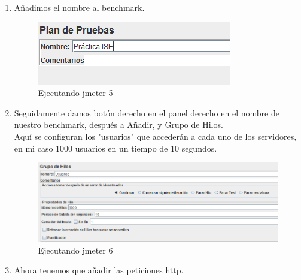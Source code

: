 \begin{enumerate}
	\item Añadimos el nombre al benchmark.
	\begin{figure}[H] %
		\centering
		\includegraphics[scale=0.5]{pics/5}  %
		\caption{Ejecutando jmeter 5} \label{fig:jmt5}
	\end{figure}

	\item Seguidamente damos botón derecho en el panel derecho en el nombre de nuestro benchmark, después a Añadir, y Grupo de Hilos.\\
	Aquí se configuran los "usuarios" que accederán a cada uno de los servidores, en mi caso 1000 usuarios en un tiempo de 10 segundos.
	
	\begin{figure}[H] %
		\centering
		\includegraphics[scale=0.5]{pics/6}  %
		\caption{Ejecutando jmeter 6} \label{fig:jmt6}
	\end{figure}

\item Ahora tenemos que añadir las peticiones http.


\end{enumerate}
